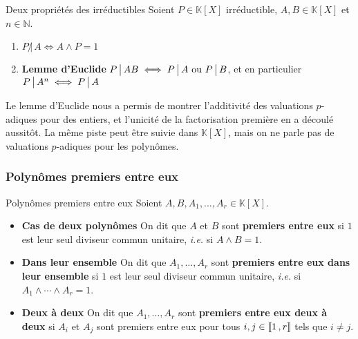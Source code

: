     \begin{prop}{Deux propriétés des irréductibles}{}
        Soient $P \in \mathbb{K}[X]$ irréductible, $A,B \in \mathbb{K}[X]$ et $n \in \mathbb{N}$.
        \begin{enumerate}
            \item $P \, \not| \, A \iff A \wedge P = 1$
            \item \textbf{Lemme d’Euclide} \quad $P \, \big| \, AB \iff P \, \big| \, A \text{ ou } P \, \big| \, B$, et en particulier $P \, \big| \, A^n \iff P \, \big| \, A$
        \end{enumerate}
    \end{prop}

    Le lemme d’Euclide nous a permis de montrer l’additivité des valuations $p$-adiques pour des entiers, et l’unicité de la factorisation première en a découlé aussitôt. La même piste peut être suivie dans $\mathbb{K}[X]$, mais on ne parle pas de valuations $p$-adiques pour les polynômes.

    \subsubsection{Polynômes premiers entre eux}

    \begin{defi}{Polynômes premiers entre eux}{}
        Soient $A,B,A_1,\ldots,A_r \in \mathbb{K}[X]$.
        \begin{itemize}
            \item \textbf{Cas de deux polynômes} \quad On dit que $A$ et $B$ sont \textbf{premiers entre eux} si $1$ est leur seul diviseur commun unitaire, \textit{i.e.} si $A \wedge B = 1$.
            \item \textbf{Dans leur ensemble} \quad On dit que $A_1,\ldots,A_r$ sont \textbf{premiers entre eux dans leur ensemble} si $1$ est leur seul diviseur commun unitaire, \textit{i.e.} si $A_1 \wedge \cdots \wedge A_r = 1$.
            \item \textbf{Deux à deux} \quad On dit que $A_1,\ldots,A_r$ sont \textbf{premiers entre eux deux à deux} si $A_i$ et $A_j$ sont premiers entre eux pour tous $i,j \in \left\llbracket 1 \, , r \right\rrbracket$ tels que $i \neq j$.
        \end{itemize}
    \end{defi}

